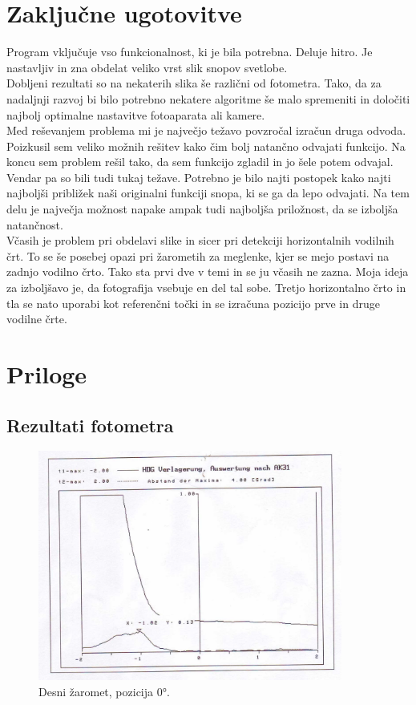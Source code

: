 \documentclass[oneside, a4paper, 12pt]{book}
\begin{document}
\chapter{Zaključne ugotovitve}
Program vključuje vso funkcionalnost, ki je bila potrebna. Deluje hitro. Je nastavljiv in zna obdelat veliko vrst slik snopov svetlobe.\\
Dobljeni rezultati so na nekaterih slika še različni od fotometra. Tako, da za nadaljnji razvoj bi bilo potrebno nekatere algoritme še malo spremeniti in določiti najbolj optimalne nastavitve fotoaparata ali kamere.\\
Med reševanjem problema mi je največjo težavo povzročal izračun druga odvoda. Poizkusil sem veliko možnih rešitev kako čim bolj natančno odvajati funkcijo. Na koncu sem problem rešil tako, da sem funkcijo zgladil in jo šele potem odvajal. Vendar pa so bili tudi tukaj težave. Potrebno je bilo najti postopek kako najti najboljši približek naši originalni funkciji snopa, ki se ga da lepo odvajati. Na tem delu je največja možnost napake ampak tudi najboljša priložnost, da se izboljša natančnost.\\
Včasih je problem pri obdelavi slike in sicer pri detekciji horizontalnih vodilnih črt. To se še posebej opazi pri žarometih za meglenke, kjer se mejo postavi na zadnjo vodilno črto. Tako sta prvi dve v temi in se ju včasih ne zazna. Moja ideja za izboljšavo je, da fotografija vsebuje en del tal sobe. Tretjo horizontalno črto in tla se nato uporabi kot referenčni točki in se izračuna pozicijo prve in druge vodilne črte.

\chapter{Priloge}
\section{Rezultati fotometra}
\label{ch:rf}


\begin{figure}
\begin{center}
\includegraphics[width=10cm]{slike/fotometer-desni-0.jpg}
\end{center}
\caption{Desni žaromet, pozicija 0°.}
\label{pic:opt-g}
\end{figure}
\end{document}
